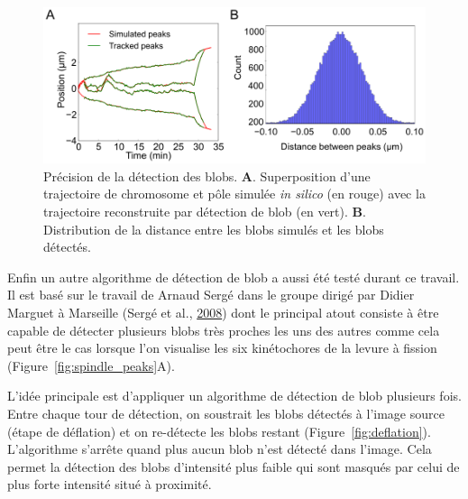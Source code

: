 \documentclass[12pt,a4paper,twoside,openright]{book}
\begin{document}
\begin{figure}[htbp]
\centering
\includegraphics{figures/results/imaging/detection_precision.png}
\caption[Précision de la détection des blobs]{\label{fig:detection_precision}Précision
de la détection des blobs. \textbf{A}. Superposition d'une trajectoire
de chromosome et pôle simulée \emph{in silico} (en rouge) avec la
trajectoire reconstruite par détection de blob (en vert). \textbf{B}.
Distribution de la distance entre les blobs simulés et les blobs
détectés.}
\end{figure}

Enfin un autre algorithme de détection de blob a aussi été testé durant
ce travail. Il est basé sur le travail de Arnaud Sergé dans le groupe
dirigé par Didier Marguet à Marseille (Sergé et al.,
\protect\hyperlink{ref-Serge2008}{2008}) dont le principal atout
consiste à être capable de détecter plusieurs blobs très proches les uns
des autres comme cela peut être le cas lorsque l'on visualise les six
kinétochores de la levure à fission (Figure~\ref{fig:spindle_peaks}A).

L'idée principale est d'appliquer un algorithme de détection de blob
plusieurs fois. Entre chaque tour de détection, on soustrait les blobs
détectés à l'image source (étape de déflation) et on re-détecte les
blobs restant (Figure~\ref{fig:deflation}). L'algorithme s'arrête quand
plus aucun blob n'est détecté dans l'image. Cela permet la détection des
blobs d'intensité plus faible qui sont masqués par celui de plus forte
intensité situé à proximité.
\end{document}
